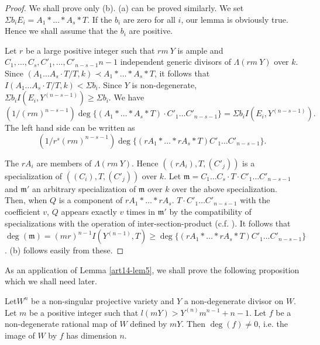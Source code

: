 \begin{proof}
We shall prove only {\rm(b)}. {\rm(a)} can be proved similarly. We set $\Sigma b_{i}E_{i}=A_{1}*\ldots * A_{s}*T$. If the $b_{i}$ are zero for all $i$, our lemma is obviously true. Hence we shall assume that the $b_{i}$ are positive.

Let $r$ be a large positive integer such that $rm\ Y$ is ample and $C_{1},\ldots,C_{s},C'_{1},\ldots,C'_{n-s-1}n-1$ independent generic divisors of $\Lambda(rm\ Y)$ over $k$. Since $(A_{1}\ldots A_{s}\cdot T/T, k)\prec A_{1}*\ldots * A_{s} * T$, it follows that $I(A_{1}\ldots A_{s}\cdot T/T,k)<\Sigma b_{i}$. Since $Y$ is non-degenerate, $\Sigma b_{i}I(E_{i},Y^{(n-s-1)})\geq \Sigma b_{i}$. We have
$$
(1/(rm)^{n-s-1})\deg \{(A_{1}*\ldots * A_{s} * T)\cdot C'_{1}\ldots C'_{n-s-1}\}=\Sigma b_{i}I(E_{i},Y^{(n-s-1)}).
$$
The left hand side can be written as
$$
(1/r^{s}(rm)^{n-s-1})\deg \{(rA_{1} * \ldots * rA_{s} * T)C'_{1}\ldots C'_{n-s-1}\}.
$$

The $rA_{i}$ are members of $\Lambda(rm\ Y)$. Hence $((rA_{i}), T, (C'_{j}))$ is a specialization of $((C_{i}),T,(C'_{j}))$ over $k$. Let $\mathfrak{m}=C_{1}\ldots C_{s}\cdot T\cdot C'_{1}\ldots C'_{n-s-1}$ and $\mathfrak{m}'$ an arbitrary specialization of $\mathfrak{m}$ over $k$ over the above specialization. Then, when $Q$ is a component of $rA_{1}*\ldots * rA_{s}$. $T\cdot C'_{1}\ldots C'_{n-s-1}$ with the coefficient $v$, $Q$ appears exactly $v$ times in $\mathfrak{m}'$ by the compatibility of specializations with the operation of inter-section-product (c.f. \cite{art14-key24}). It follows that $\deg(\mathfrak{m})=(mr)^{n-1} I(Y^{(n-1)}, T)\geq \deg \{(rA_{1}*\ldots * rA_{s} * T)C'_{1}\ldots C'_{n-s-1}\}$. (b) follows easily from these.
\end{proof}

As an application of Lemma \ref{art14-lem5}, we shall prove the following proposition which we shall need later.

\begin{proposition}\label{art14-prop5}
Let\pageoriginale $W^{n}$ be a non-singular projective variety and $Y$ a non-degenerate divisor on $W$. Let $m$ be a positive integer such that $l(mY)>Y^{(n)}m^{n-1}+n-1$. Let $f$ be a non-degenerate rational map of $W$ defined by $mY$. Then $\deg (f)\neq 0$, i.e. the image of $W$ by $f$ has dimension $n$.
\end{proposition}

